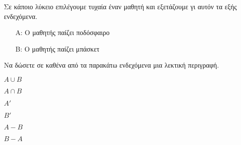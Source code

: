 Σε κάποιο λύκειο επιλέγουμε τυχαία έναν μαθητή και εξετάζουμε γι αυτόν τα εξής ενδεχόμενα.
\begin{enumerate}
\item[Α:] Ο μαθητής παίζει ποδόσφαιρο
\item[Β:] Ο μαθητής παίζει μπάσκετ
\end{enumerate}
Να δώσετε σε καθένα από τα παρακάτω ενδεχόμενα μια λεκτική περιγραφή.
\begin{multicols}{3}
\begin{alist}
\item $ A\cup B $
\item $ A\cap B $
\item $ A' $
\item $ B' $
\item $ A-B $
\item $ B-A $
\end{alist}
\end{multicols}
